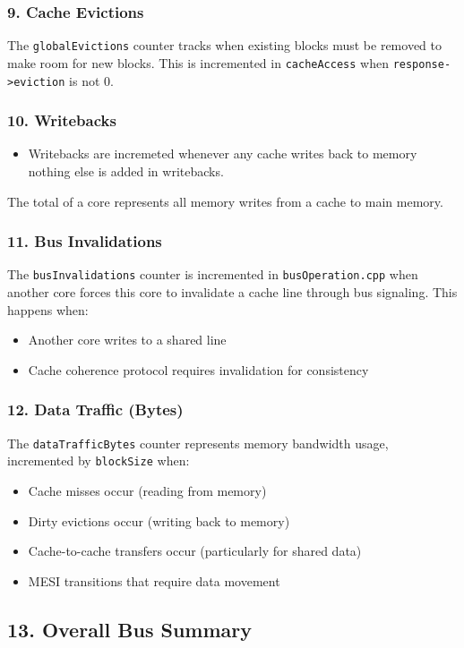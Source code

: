 \documentclass[11pt]{article}
\begin{document}
\subsubsection*{9. Cache Evictions}
The \texttt{globalEvictions} counter tracks when existing blocks must be removed to make room for new blocks. This is incremented in \texttt{cacheAccess} when \texttt{response->eviction} is not 0.

\subsubsection*{10. Writebacks}
\begin{itemize}
  \item Writebacks are incremeted whenever any cache writes back to memory nothing else is added in writebacks.
\end{itemize}
The total of a core represents all memory writes from a cache to main memory.

\subsubsection*{11. Bus Invalidations}
The \texttt{busInvalidations} counter is incremented in \texttt{busOperation.cpp} when another core forces this core to invalidate a cache line through bus signaling. This happens when:
\begin{itemize}
  \item Another core writes to a shared line
  \item Cache coherence protocol requires invalidation for consistency
\end{itemize}

\subsubsection*{12. Data Traffic (Bytes)}
The \texttt{dataTrafficBytes} counter represents memory bandwidth usage, incremented by \texttt{blockSize} when:
\begin{itemize}
  \item Cache misses occur (reading from memory)
  \item Dirty evictions occur (writing back to memory)
  \item Cache-to-cache transfers occur (particularly for shared data)
  \item MESI transitions that require data movement
\end{itemize}

\subsection*{13. Overall Bus Summary}
\end{document}

